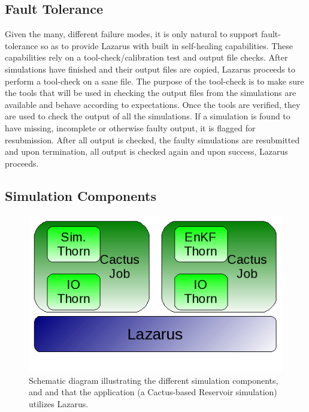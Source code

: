 \documentclass{sig-alternate}
\newcommand{\up}{\vspace*{-0.3em}}
\begin{document}
\subsection{Fault Tolerance}
Given the many, different failure modes, it is only natural to support
fault-tolerance so as to provide Lazarus with built in self-healing
capabilities. These capabilities rely on a tool-check/calibration test
and output file checks. After simulations have finished and their
output files are copied, Lazarus proceeds to perform a tool-check
on a sane file. The purpose of the tool-check is to make sure the
tools that will be used in checking the output files from the
simulations are available and behave according to expectations. Once
the tools are verified, they are used to check the output of all the
simulations. If a simulation is found to have missing, incomplete or
otherwise faulty output, it is flagged for resubmission.  After all
output is checked, the faulty simulations are resubmitted and upon
termination, all output is checked again and upon success, Lazarus
proceeds.


\subsection{Simulation Components}
\begin{figure}
\begin{center}
\includegraphics[scale=0.5]{./figures/Simulations.png}
\caption{Schematic diagram illustrating the different simulation components, and and that the application (a Cactus-based Reservoir
  simulation) utilizes Lazarus.}\label{fig:application_usage} 
\up\up\up \up\up\up \up\up\up \up\up\up \up\up
\end{center} 
\end{figure}
 
\end{document}
